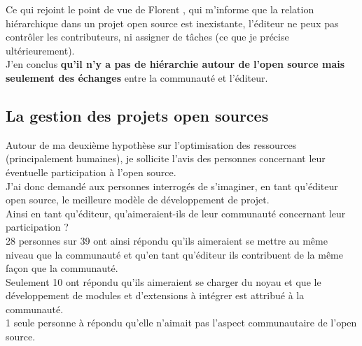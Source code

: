 			\begin{center}
				\textit{
				}
			\end{center}

			Ce qui rejoint le point de vue de Florent , qui m'informe que la relation hiérarchique dans un projet open source est inexistante, l'éditeur ne peux pas contrôler les contributeurs, ni assigner de tâches (ce que je précise ultérieurement).\\

			J'en conclus \textbf{qu'il n'y a pas de hiérarchie autour de l'open source mais seulement des échanges} entre la communauté et l'éditeur.

		\subsection{La gestion des projets open sources}

			Autour de ma deuxième hypothèse sur l'optimisation des ressources (principalement humaines), je sollicite l'avis des personnes concernant leur éventuelle participation à l'open source.\\

			J'ai donc demandé aux personnes interrogés de s'imaginer, en tant qu'éditeur open source, le meilleure modèle de développement de projet.\\

			Ainsi en tant qu'éditeur, qu'aimeraient-ils de leur communauté concernant leur participation ?\\

			28 personnes sur 39 ont ainsi répondu qu'ils aimeraient se mettre au même niveau que la communauté et qu'en tant qu'éditeur ils contribuent de la même façon que la communauté.\\

			Seulement 10 ont répondu qu'ils aimeraient se charger du noyau et que le développement de modules et d'extensions à intégrer est attribué à la communauté.\\

			1 seule personne à répondu qu'elle n'aimait pas l'aspect communautaire de l'open source.

